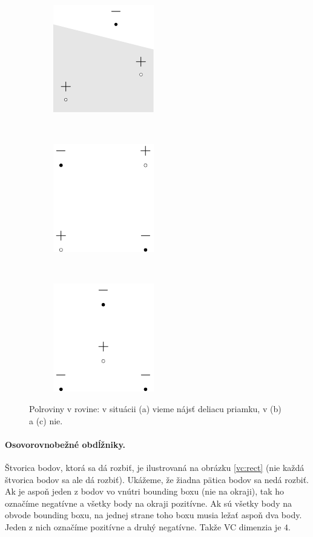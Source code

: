 \begin{figure}
  \centering
  \begin{subfigure}[b]{0.3\linewidth}
    \centering
    \includegraphics[scale=1]{obrazky/halfplane1.pdf}
    \caption{}
  \end{subfigure}
  ~
  \begin{subfigure}[b]{0.3\linewidth}
    \centering
    \includegraphics[scale=1]{obrazky/halfplane2.pdf}
    \caption{}
  \end{subfigure}
  ~
  \begin{subfigure}[b]{0.3\linewidth}
    \centering
    \includegraphics[scale=1]{obrazky/halfplane3.pdf}
    \caption{}
  \end{subfigure}
  \caption{Polroviny v rovine: v situácii (a) vieme nájsť deliacu priamku, v (b) a (c) nie.}
  \label{vc:halfplane}
\end{figure}

\paragraph{Osovorovnobežné obdĺžniky.} Štvorica bodov, ktorá sa dá
rozbiť, je ilustrovaná na obrázku \ref{vc:rect} (nie každá štvorica
bodov sa ale dá rozbiť). Ukážeme, že žiadna pätica bodov sa nedá
rozbiť. Ak je aspoň jeden z bodov vo vnútri bounding boxu (nie
na okraji), tak ho označíme negatívne a všetky body na okraji pozitívne.
Ak sú všetky body na obvode bounding boxu, na jednej strane toho boxu
musia ležať aspoň dva body. Jeden z nich označíme pozitívne a druhý
negatívne. Takže VC dimenzia je $4$.

